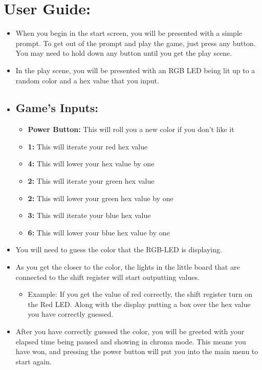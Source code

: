 \documentclass[12pt]{article}
\begin{document}
\section{User Guide:}
\begin{itemize}
  \item When you begin in the start screen, you will be presented with a 
    simple prompt. To get out of the prompt and play the game, just press any button.
    You may need to hold down any button until you get the play scene.
  \item In the play scene, you will be presented with an RGB LED being lit up
    to a random color and a hex value that you input.
    \item\subsection*{Game's Inputs:}
    \begin{itemize}
      \item\textbf{Power Button:} This will roll you a new color if you don't like it 
      \item\textbf{1:} This will iterate your red hex value
      \item\textbf{4:} This will lower your hex value by one
      \item\textbf{2:} This will iterate your green hex value
      \item\textbf{2:} This will lower your green hex value by one
      \item\textbf{3:} This will iterate your blue hex value
      \item\textbf{6:} This will lower your blue hex value by one
    \end{itemize}
  \item You will need to guess the color that the RGB-LED is displaying.
  \item As you get the closer to the color, the lights in the little board
    that are connected to the shift register will start outputting values.
    \begin{itemize}
      \item Example: If you get the value of red correctly,
        the shift register turn on the Red LED.
        Along with the display putting a box over the hex value you have correctly guessed.
    \end{itemize}
  \item After you have correctly guessed the color, you will be greeted with your
    elapsed time being paused and showing in chroma mode.
    This means you have won, and pressing 
    the power button will put you into the main menu to start again.
\end{itemize}
\end{document}
